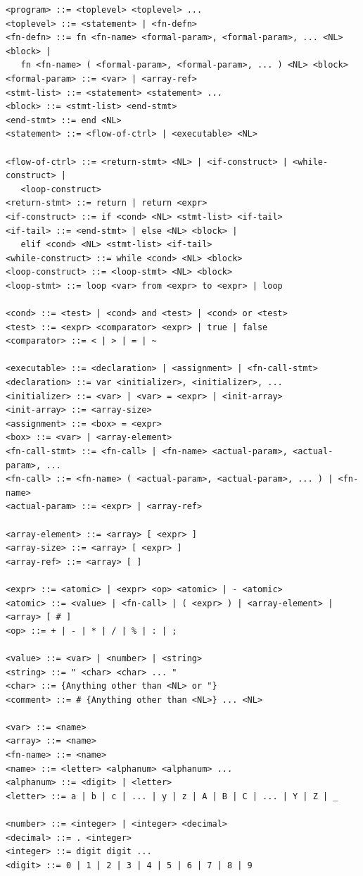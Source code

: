 \documentclass[12pt,a4paper,twoside]{article}
\renewcommand{\_}{\texttt{\symbol{95}}}
\begin{document}
\begin{verbatim}
<program> ::= <toplevel> <toplevel> ...
<toplevel> ::= <statement> | <fn-defn>
<fn-defn> ::= fn <fn-name> <formal-param>, <formal-param>, ... <NL> <block> |
   fn <fn-name> ( <formal-param>, <formal-param>, ... ) <NL> <block>
<formal-param> ::= <var> | <array-ref>
<stmt-list> ::= <statement> <statement> ...
<block> ::= <stmt-list> <end-stmt>
<end-stmt> ::= end <NL>
<statement> ::= <flow-of-ctrl> | <executable> <NL>

<flow-of-ctrl> ::= <return-stmt> <NL> | <if-construct> | <while-construct> |
   <loop-construct>
<return-stmt> ::= return | return <expr>
<if-construct> ::= if <cond> <NL> <stmt-list> <if-tail>
<if-tail> ::= <end-stmt> | else <NL> <block> |
   elif <cond> <NL> <stmt-list> <if-tail>
<while-construct> ::= while <cond> <NL> <block>
<loop-construct> ::= <loop-stmt> <NL> <block>
<loop-stmt> ::= loop <var> from <expr> to <expr> | loop

<cond> ::= <test> | <cond> and <test> | <cond> or <test>
<test> ::= <expr> <comparator> <expr> | true | false
<comparator> ::= < | > | = | ~

<executable> ::= <declaration> | <assignment> | <fn-call-stmt>
<declaration> ::= var <initializer>, <initializer>, ...
<initializer> ::= <var> | <var> = <expr> | <init-array>
<init-array> ::= <array-size>
<assignment> ::= <box> = <expr>
<box> ::= <var> | <array-element>
<fn-call-stmt> ::= <fn-call> | <fn-name> <actual-param>, <actual-param>, ...
<fn-call> ::= <fn-name> ( <actual-param>, <actual-param>, ... ) | <fn-name>
<actual-param> ::= <expr> | <array-ref>

<array-element> ::= <array> [ <expr> ]
<array-size> ::= <array> [ <expr> ]
<array-ref> ::= <array> [ ]

<expr> ::= <atomic> | <expr> <op> <atomic> | - <atomic>
<atomic> ::= <value> | <fn-call> | ( <expr> ) | <array-element> | <array> [ # ]
<op> ::= + | - | * | / | % | : | ;

<value> ::= <var> | <number> | <string>
<string> ::= " <char> <char> ... "
<char> ::= {Anything other than <NL> or "}
<comment> ::= # {Anything other than <NL>} ... <NL>

<var> ::= <name>
<array> ::= <name>
<fn-name> ::= <name>
<name> ::= <letter> <alphanum> <alphanum> ...
<alphanum> ::= <digit> | <letter>
<letter> ::= a | b | c | ... | y | z | A | B | C | ... | Y | Z | _

<number> ::= <integer> | <integer> <decimal>
<decimal> ::= . <integer>
<integer> ::= digit digit ...
<digit> ::= 0 | 1 | 2 | 3 | 4 | 5 | 6 | 7 | 8 | 9
\end{verbatim}
\end{document}
